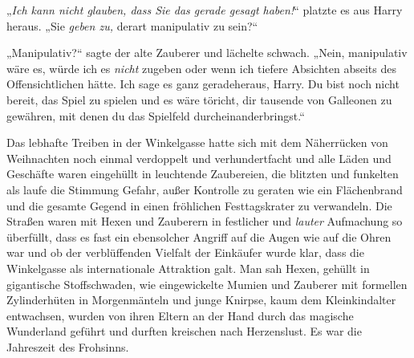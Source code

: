 „\emph{Ich kann nicht glauben, dass Sie das gerade gesagt haben!}“ platzte es aus Harry heraus. „Sie \emph{geben zu,} derart manipulativ zu sein?“

„Manipulativ?“ sagte der alte Zauberer und lächelte schwach. „Nein, manipulativ wäre es, würde ich es \emph{nicht} zugeben oder wenn ich tiefere Absichten abseits des Offensichtlichen hätte. Ich sage es ganz geradeheraus, Harry. Du bist noch nicht bereit, das Spiel zu spielen und es wäre töricht, dir tausende von Galleonen zu gewähren, mit denen du das Spielfeld durcheinanderbringst.“

\later

Das lebhafte Treiben in der Winkelgasse hatte sich mit dem Näherrücken von Weihnachten noch einmal verdoppelt und verhundertfacht und alle Läden und Geschäfte waren eingehüllt in leuchtende Zaubereien, die blitzten und funkelten als laufe die Stimmung Gefahr, außer Kontrolle zu geraten wie ein Flächenbrand und die gesamte Gegend in einen fröhlichen Festtagskrater zu verwandeln. Die Straßen waren mit Hexen und Zauberern in festlicher und \emph{lauter} Aufmachung so überfüllt, dass es fast ein ebensolcher Angriff auf die Augen wie auf die Ohren war und ob der verblüffenden Vielfalt der Einkäufer wurde klar, dass die Winkelgasse als internationale Attraktion galt. Man sah Hexen, gehüllt in gigantische Stoffschwaden, wie eingewickelte Mumien und Zauberer mit formellen Zylinderhüten in Morgenmänteln und junge Knirpse, kaum dem Kleinkindalter entwachsen, wurden von ihren Eltern an der Hand durch das magische Wunderland geführt und durften kreischen nach Herzenslust. Es war die Jahreszeit des Frohsinns.%

